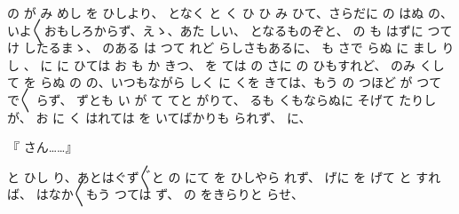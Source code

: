 の
が
み
めし
を
ひしより、
となく
と
く
ひ
ひ
み
ひて、さらだに
の
はぬ
の、いよ〳〵おもしろからず、えゝ、あた
しい、
となるものぞと、
の
も
はずに
つて
け
したるまゝ、
のある
は
つて
れど
らしさもあるに、
も
さで
らぬ
に
まし
りし
、
に
に
ひては
お
も
か
きつ、
を
ては
の
さに
の
ひもすれど、
のみ
くして
を
らぬ
の
の、いつもながら
しく
に
くを
きては、もう
の
つほど
が
つて
で〳〵
らず、
ずとも
い
が
て
てと
がりて、
るも
くもならぬに
そげて
たりしが、
お
に
く
はれては
を
いてばかりも
られず、
に、

『
さん……』

と
ひし
り、あとはぐず〴〵と
の
にて
を
ひしやら
れず、
げに
を
げて
と
すれば、
はなか〳〵もう
つては
ず、
の
をきらりと
らせ、

